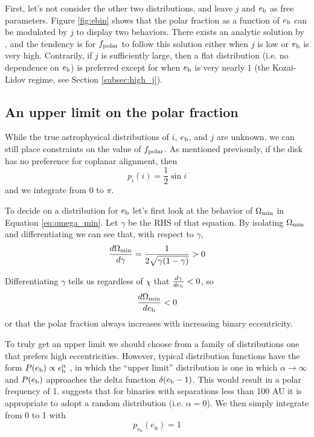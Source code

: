 \documentclass[twocolumn]{aastex631}
\begin{document}
First, let's not consider the other two distributions, and leave $j$ and $e_{\rm b}$ as free parameters. Figure \ref{fig:ebin} shows that the polar fraction
as a function of $e_{\rm b}$ can be modulated by $j$ to display two behaviors. There exists an analytic solution by \citet{zanazzi2018}, and the tendency is
for $f_{\rm polar}$ to follow this solution either when $j$ is low or $e_{\rm b}$ is very high. Contrarily, if $j$ is sufficiently large, then a flat distribution
(i.e. no dependence on $e_{\rm b}$) is preferred except for when $e_{\rm b}$ is very nearly $1$ (the Kozai-Lidov regime, see Section \ref{subsec:high_j}).

\subsection{An upper limit on the polar fraction}
\label{subsec:fp_limit}
While the true astrophysical distributions of $i$, $e_{\rm b}$, and $j$ are unknown, we can still place constraints on the value of $f_{\rm polar}$.
As mentioned previously, if the disk has no preference for coplanar alignment, then
\begin{equation}
    p_i(i) = \frac{1}{2} \sin{i}
\end{equation}
and we integrate from $0$ to $\pi$.


To decide on a distribution for $e_{\rm b}$ let's first look at the behavior of $\Omega_{\rm min}$ in Equation \ref{eq:omega_min}. Let $\gamma$
be the RHS of that equation. By isolating $\Omega_{\rm min}$ and differentiating we can see that, with respect to $\gamma$,
\begin{equation}
    \frac{d\Omega_{\rm min}}{d \gamma} = \frac{1}{2\sqrt{ \gamma (1 - \gamma)}} > 0
\end{equation}

Differentiating $\gamma$ tells us regardless of $\chi$ that $\frac{d\gamma}{de_{\rm b}} < 0$, so
\begin{equation}
    \frac{d\Omega_{\rm min}}{de_{\rm b}} < 0
\end{equation}
or that the polar fraction always increases with increasing binary eccentricity.


To truly get an upper limit we should choose from a family of distributions one that prefers high eccentricities. However, typical distribution
functions have the form $P(e_{\rm b}) \propto e_{\rm b}^\alpha$ \citep[e.g.][]{hwang2022,ceppi2024}, in which the ``upper limit'' distribution
is one in which $\alpha \rightarrow \infty$ and $P(e_{\rm b})$ approaches the delta function $\delta(e_{\rm b} - 1)$. This would result in a polar frequency
of 1. \citet{hwang2022} suggests that for binaries with separations less than 100 AU it is appropriate to adopt a random distribution (i.e. $\alpha=0$). We then simply
integrate from 0 to 1 with
\begin{equation}
    p_{e_\text{b}}(e_\text{n}) = 1
\end{equation}
\end{document}
